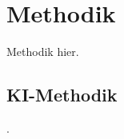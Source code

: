 
\section{Methodik}
\label{sec:ki:methodik}

Methodik hier.

\subsection{KI-Methodik}
\label{sec:ki_methodik}

.
